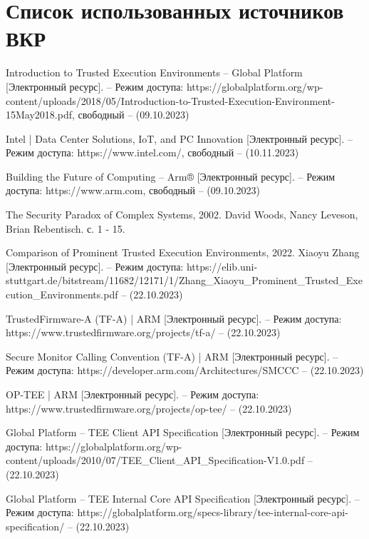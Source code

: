 \section{Список использованных источников ВКР}

\begingroup
\renewcommand{\section}[2]{}
\begin{thebibliography}{}
Introduction to Trusted Execution Environments -- Global Platform [Электронный ресурс]. – Режим доступа: https://globalplatform.org/wp-content/uploads/2018/05/Introduction-to-Trusted-Execution-Environment-15May2018.pdf, свободный – (09.10.2023)

Intel | Data Center Solutions, IoT, and PC Innovation [Электронный ресурс]. – Режим доступа: https://www.intel.com/, свободный – (10.11.2023)

Building the Future of Computing – Arm® [Электронный ресурс]. – Режим доступа: https://www.arm.com, свободный – (09.10.2023)

The Security Paradox of Complex Systems, 2002. David Woods, Nancy Leveson, Brian Rebentisch. с. 1 - 15.

Comparison of Prominent Trusted Execution Environments, 2022. Xiaoyu Zhang [Электронный ресурс]. – Режим доступа: https://elib.uni-stuttgart.de/bitstream/11682/12171/1/Zhang\_Xiaoyu\_Prominent\_Trusted\_Execution\_Environments.pdf – (22.10.2023)

TrustedFirmware-A (TF-A) | ARM [Электронный ресурс]. – Режим доступа: https://www.trustedfirmware.org/projects/tf-a/ – (22.10.2023)

Secure Monitor Calling Convention (TF-A) | ARM [Электронный ресурс]. – Режим доступа: https://developer.arm.com/Architectures/SMCCC – (22.10.2023)

OP-TEE | ARM [Электронный ресурс]. – Режим доступа: https://www.trustedfirmware.org/projects/op-tee/ – (22.10.2023)

Global Platform -- TEE Client API Specification [Электронный ресурс]. – Режим доступа: https://globalplatform.org/wp-content/uploads/2010/07/TEE\_Client\_API\_Specification-V1.0.pdf – (22.10.2023)

Global Platform -- TEE Internal Core API Specification [Электронный ресурс]. – Режим доступа: https://globalplatform.org/specs-library/tee-internal-core-api-specification/ – (22.10.2023)


\end{thebibliography}
